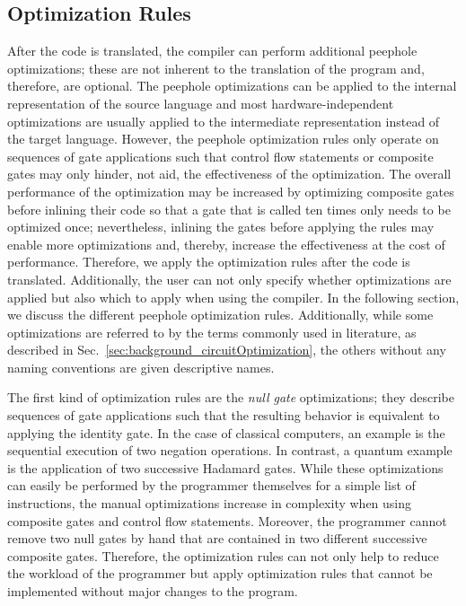 \subsection{Optimization Rules}
\label{sec:concept_optimizationRules}
After the code is translated, the compiler can perform additional peephole optimizations; these are not inherent to the translation of the program and, therefore, are optional. 
The peephole optimizations can be applied to the internal representation of the source language and most hardware-independent optimizations are usually applied to the intermediate representation instead of the target language. However, the peephole optimization rules only operate on sequences of gate applications such that control flow statements or composite gates may only hinder, not aid, the effectiveness of the optimization. The overall performance of the optimization may be increased by optimizing composite gates before inlining their code so that a gate that is called ten times only needs to be optimized once; nevertheless, inlining the gates before applying the rules may enable more optimizations and, thereby, increase the effectiveness at the cost of performance. Therefore, we apply the optimization rules after the code is translated.
Additionally, the user can not only specify whether optimizations are applied but also which to apply when using the compiler. In the following section, we discuss the different peephole optimization rules. 
Additionally, while some optimizations are referred to by the terms commonly used in literature, as described in Sec.~\ref{sec:background_circuitOptimization}, the others without any naming conventions are given descriptive names.

The first kind of optimization rules are the \emph{null gate} optimizations; they describe sequences of gate applications such that the resulting behavior is equivalent to applying the identity gate. In the case of classical computers, an example is the sequential execution of two negation operations. In contrast, a quantum example is the application of two successive Hadamard gates. While these optimizations can easily be performed by the programmer themselves for a simple list of instructions, the manual optimizations increase in complexity when using composite gates and control flow statements. Moreover, the programmer cannot remove two null gates by hand that are contained in two different successive composite gates. Therefore, the optimization rules can not only help to reduce the workload of the programmer but apply optimization rules that cannot be implemented without major changes to the program.

